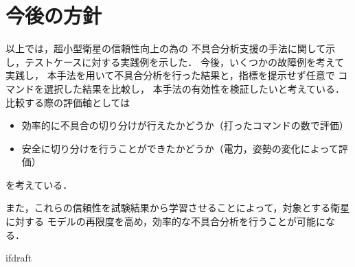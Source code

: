 \documentclass[11pt]{jsreport}
\begin{document}
\section{今後の方針}
以上では，超小型衛星の信頼性向上の為の
不具合分析支援の手法に関して示し，テストケースに対する実践例を示した．
今後，いくつかの故障例を考えて実践し，
本手法を用いて不具合分析を行った結果と，指標を提示せず任意で
コマンドを選択した結果を比較し，
本手法の有効性を検証したいと考えている．
比較する際の評価軸としては
\begin{itemize}
   \item 効率的に不具合の切り分けが行えたかどうか（打ったコマンドの数で評価）
   \item 安全に切り分けを行うことができたかどうか（電力，姿勢の変化によって評価）
\end{itemize}
を考えている．

また，これらの信頼性を試験結果から学習させることによって，対象とする衛星に対する
モデルの再限度を高め，効率的な不具合分析を行うことが可能になる．

\begin{comment}
\section{まとめ}

モデル化に関して
実際の衛星ではコンポーネント数やコマンド・テレメトリの数
が膨大であるためモデルが複雑化し，人によるモデル生成では
ヒューマンエラーや，作業量を考えると非現実的である．
そのため，将来的にはこれらを必要最低限の情報から生成する手法に関しても
検討していく．

また，故障診断のコンテキストによってどこまで掘り下げるべきか使い分けるべきである
\cite{Ontology1998}ことを書く．

一方で，人工衛星は内部のコンポーネントが非常に密集しているおり，人間が設計時に考慮した
意図したつながりだけでなく，意図しないつながりも多く存在する．
このような意図しないつながりによって，波及効果が発生することが衛星内部の理解が
困難になり
\end{comment}

\expandafter\ifx\csname ifdraft\endcsname\relax
  
\end{document}
